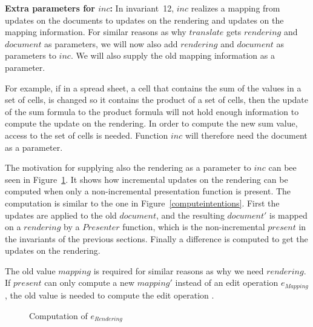 {\bf }{\bf Extra parameters for $inc$: }In invariant~12, $inc$ realizes a mapping from updates on the documents to updates on the rendering and updates on the mapping information. For similar reasons as why $translate$ gets $rendering$ and $document$ as parameters, we will now also add $rendering$ and $document$ as parameters to $inc$. We will also supply the old mapping information as a parameter.

For example, if in a spread sheet, a cell that contains the sum of the values in a set of cells, is changed so it contains the product of a set of cells, then the update of the sum formula to the product formula will not hold enough information to compute the update on the rendering. In order to compute the new sum value, access to the set of cells is needed. Function $inc$ will therefore need the document as a parameter. 

The motivation for supplying also the rendering as a parameter to $inc$ can bee seen in Figure~\ref{computeops}. It shows how incremental updates on the rendering can be computed when only a non-incremental presentation function is present. The computation is similar to the one in Figure~\ref{computeintentions}. First the updates are applied to the old $document$, and the resulting $document'$ is mapped on a $rendering$ by a $Presenter$ function, which is the non-incremental $present$ in the invariants of the previous sections. Finally a difference is computed to get the updates on the rendering.

The old value $mapping$ is required for similar reasons as why we need $rendering$. If $present$ can only compute a new $mapping'$ instead of an edit operation $e_{Mapping}$, the old value is needed to compute the edit operation . 
\begin{figure}
\begin{small}
\begin{center}
\begin{center}
\begin{small}
\bigskip \noindent
{}
\end{small}
\end{center}\caption{Computation of $e_{Rendering}$ }\label{computeops} 
\end{center}
\end{small}
\end{figure}




